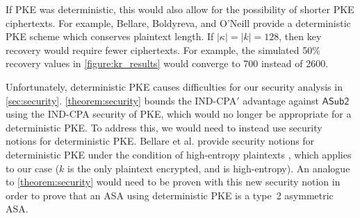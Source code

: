 If \textsf{PKE} was deterministic, this would also allow for the possibility of shorter \textsf{PKE} ciphertexts. For example, Bellare, Boldyreva, and O'Neill provide a deterministic PKE scheme which conserves plaintext length. If $|\kappa|=|k|=128$, then key recovery would require fewer ciphertexts. For example, the simulated 50\% recovery values in \autoref{figure:kr_results} would converge to 700 instead of 2600.

Unfortunately, deterministic \textsf{PKE} causes difficulties for our security analysis in \autoref{sec:security}. \autoref{theorem:security} bounds the IND-CPA$'$ advantage against $\mathsf{ASub2}$ using the IND-CPA security of \textsf{PKE}, which would no longer be appropriate for a deterministic \textsf{PKE}. To address this, we would need to instead use security notions for deterministic \textsf{PKE}. Bellare et al. provide security notions for deterministic PKE under the condition of high-entropy plaintexts \cite{C:BelBolONe07}, which applies to our case ($k$ is the only plaintext encrypted, and is high-entropy). An analogue to \autoref{theorem:security} would need to be proven with this new security notion in order to prove that an ASA using deterministic PKE is a type~2 asymmetric ASA.
